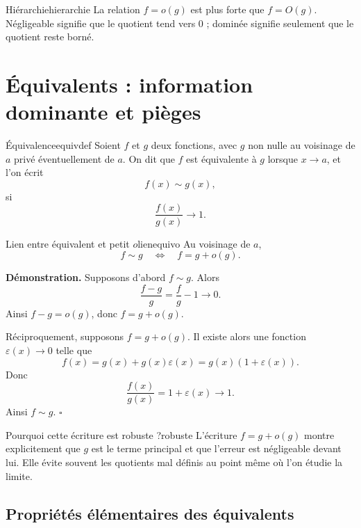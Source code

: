 \documentclass[11pt,a4paper]{article}
\newcommand{\eps}{\varepsilon}
\begin{document}
\begin{retenirbox}{Hiérarchie}{hierarchie}
La relation $f=o(g)$ est plus forte que $f=O(g)$. Négligeable signifie que le quotient tend vers $0$ ; dominée signifie seulement que le quotient reste borné.
\end{retenirbox}

\section{Équivalents : information dominante et pièges}

\begin{definitionbox}{Équivalence}{equivdef}
Soient $f$ et $g$ deux fonctions, avec $g$ non nulle au voisinage de $a$ privé éventuellement de $a$. On dit que $f$ est équivalente à $g$ lorsque $x\to a$, et l'on écrit
\[
  f(x)\sim g(x),
\]
si
\[
  \frac{f(x)}{g(x)}\longrightarrow 1.
\]
\end{definitionbox}

\begin{propositionbox}{Lien entre équivalent et petit $o$}{lienequivo}
Au voisinage de $a$,
\[
  f\sim g\quad\Longleftrightarrow\quad f=g+o(g).
\]
\end{propositionbox}

\textbf{Démonstration.} Supposons d'abord $f\sim g$. Alors
\[
  \frac{f-g}{g}=\frac{f}{g}-1\longrightarrow0.
\]
Ainsi $f-g=o(g)$, donc $f=g+o(g)$.

Réciproquement, supposons $f=g+o(g)$. Il existe alors une fonction $\eps(x)\to0$ telle que
\[
  f(x)=g(x)+g(x)\eps(x)=g(x)(1+\eps(x)).
\]
Donc
\[
  \frac{f(x)}{g(x)}=1+\eps(x)\longrightarrow1.
\]
Ainsi $f\sim g$.
\hfill $\square$

\begin{remarkbox}{Pourquoi cette écriture est robuste ?}{robuste}
L'écriture $f=g+o(g)$ montre explicitement que $g$ est le terme principal et que l'erreur est négligeable devant lui. Elle évite souvent les quotients mal définis au point même où l'on étudie la limite.
\end{remarkbox}

\subsection{Propriétés élémentaires des équivalents}
\end{document}
